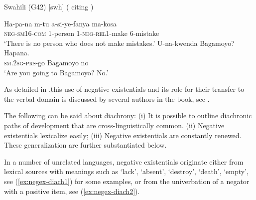 \documentclass[output=paper,chinesefont,colorlinks,citecolor=brown]{langscibook}
\begin{document}
\begin{exe}
\ex Swahili (G42) [swh] ( citing \citet[25]{KingeiNdalu2009}) \label{ex:intro:swahili-1}
\begin{xlist}
\ex \label{ex:intro:swahili-1a}
\gll Ha-pa-na m-tu a-si-ye-fanya ma-kosa\\
\textsc{neg}-\textsc{sm}16-\textsc{com} 1-person
1-\textsc{neg}-\textsc{rel}1-make 6-mistake\\
\glt `There is no person who does not make mistakes.'
\ex \label{ex:intro:swahili-1b}
\gll U-na-kwenda Bagamoyo? Hapana.\\
	\textsc{sm.2sg}-\textsc{prs}-go Bagamoyo no\\
\glt 	`Are you going to Bagamoyo? No.'
\end{xlist}
\end{exe}
As detailed in ,this use of negative existentials and its role for their transfer to the verbal domain is discussed by several authors in the book, see \citet{chapters/Bantu-Bernander-Devos-Gibson,chapters/Guillaume_Tacana,chapters/Intertwining-Auwera-Krasnoukhova-Vossen}.

The following can be said about diachrony:
(i) It is possible to outline diachronic paths of development that are cross-linguistically common. (ii) Negative existentials lexicalize easily; (iii) Negative existentials are constantly renewed. These generalization are further substantiated below.

In a number of unrelated languages, negative existentials originate either from lexical sources with meanings such as ‘lack’, ‘absent’, ‘destroy’, ‘death’, ‘empty’, see (\ref{ex:negex-diach1}) for some examples, or from the univerbation of a negator with a positive item, see (\ref{ex:negex-diach2}).
\end{document}
